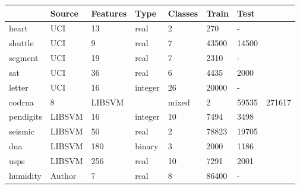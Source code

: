 \begin{tabular}{|l|llllll|}
	\hline
	& Source & Features & Type & Classes & Train & Test \\\hline
	heart & UCI & 13 & real & 2 & 270 & - \\
	shuttle & UCI & 9 & real & 7 & 43500 & 14500 \\
	segment & UCI & 19 & real & 7 & 2310 & - \\
	sat & UCI & 36 & real & 6 & 4435 & 2000 \\
	letter & UCI & 16 & integer & 26 & 20000 & - \\
	codrna & 8 & LIBSVM & & mixed & 2 & 59535 & 271617 \\
	pendigits & LIBSVM & 16 & integer & 10 & 7494 & 3498 \\
	seismic & LIBSVM & 50 & real & 2 & 78823 & 19705 \\
	dna & LIBSVM & 180 & binary & 3 & 2000 & 1186 \\
	usps & LIBSVM & 256 & real & 10 & 7291 & 2001 \\
	humidity & Author & 7 & real & 8 & 86400 & - \\\hline
\end{tabular}


